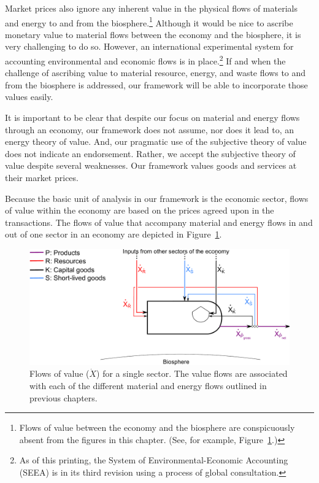 Market prices also ignore any inherent value 
in the physical flows
of materials and energy to and from the biosphere.\footnote{Flows 
	of value between the economy and the biosphere
	are conspicuously absent 
	from the figures in this chapter. 
	(See, for example, Figure~\ref{fig:basic_value}.)}
Although it would be nice to ascribe monetary value to material flows between
the economy and the biosphere, it is very challenging to do so.\cite{Nordhaus:1999aa,SEEA2012}
However, an international experimental system 
for accounting environmental and economic flows is in place.\footnote{As of this printing, 
the System of Environmental-Economic Accounting (SEEA) is in its third revision 
using a process of global consultation.}\cite{UNSEEAWeb}
If and when the challenge of ascribing value
to material resource, energy, and waste flows 
to and from the biosphere is addressed, 
our framework will be able to incorporate those values easily.  

It is important to be clear that 
despite our focus on material and energy flows through an economy, 
our framework does not assume, nor does it lead to, 
an energy theory of value.
And, our pragmatic use of the subjective theory of value
does not indicate an endorsement. 
Rather, we accept the subjective theory of value
despite several weaknesses.
Our framework values goods and services at their market prices.

Because the basic unit of analysis in our framework is the economic sector, 
flows of value within the economy are based on the prices agreed 
upon in the transactions. 
The flows of value that accompany material and energy flows in and out 
of one sector in an economy are depicted in Figure~\ref{fig:basic_value}. 

\begin{figure}[!ht]
\centering
\includegraphics[width=\linewidth]{Part_2/Chapter_Values/images/PERKS_basic_unit_value_all.pdf}
\caption[Flows of value for a single sector]{Flows of value ($\dot{X}$) 
for a single sector. 
The value flows are associated with each of the different 
material and energy flows outlined in previous chapters.}
\label{fig:basic_value} 
\end{figure}

